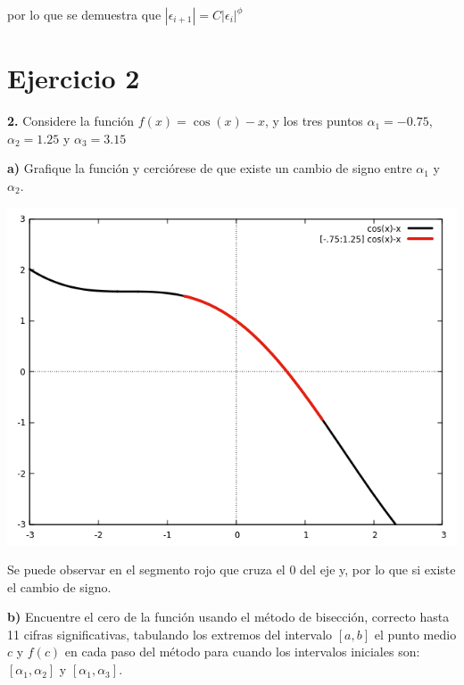 \documentclass{article} %
\begin{document}
por lo que se demuestra que $|\epsilon_{i+1}| = C|\epsilon_i|^\phi$

\newpage
\section*{Ejercicio 2}
\textbf{2.} Considere la función $f(x) = \cos{(x)}-x$, y los tres puntos $\alpha_1 = -0.75$, $\alpha_2 = 1.25$ y $\alpha_3 = 3.15$

\textbf{a)} Grafique la función y cerciórese de que existe un cambio de signo entre $\alpha_1$ y $\alpha_2$.

\begin{center}
\includegraphics[scale=0.5]{images/grafica1.png}    
\end{center}

Se puede observar en el segmento rojo que cruza el 0 del eje y, por lo que si existe el cambio de signo.

\textbf{b)} Encuentre el cero de la función usando el método de bisección, correcto hasta 11
cifras significativas, tabulando los extremos del intervalo $[a, b]$ el punto medio $c$ y
$f(c)$ en cada paso del método para cuando los intervalos iniciales son: $[\alpha_1,\alpha_2]$ y $[\alpha_1,\alpha_3]$.
\end{document}

